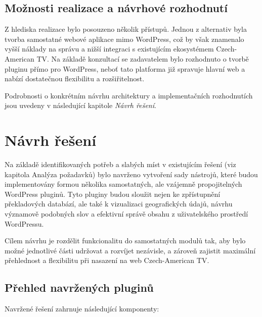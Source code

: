 \documentclass[czech, ba, kiv, he]{fasthesis}
\begin{document}
\subsection{Možnosti realizace a návrhové rozhodnutí}

Z hlediska realizace bylo posouzeno několik přístupů. Jednou z alternativ byla tvorba samostatné webové aplikace mimo WordPress, což by však znamenalo vyšší náklady na správu a nižší integraci s existujícím ekosystémem Czech-American TV. Na základě konzultací se zadavatelem bylo rozhodnuto o tvorbě pluginu přímo pro WordPress, neboť tato platforma již spravuje hlavní web a nabízí dostatečnou flexibilitu a rozšiřitelnost.

Podrobnosti o konkrétním návrhu architektury a implementačních rozhodnutích jsou uvedeny v následující kapitole \textit{Návrh řešení}.

\section{Návrh řešení}


Na základě identifikovaných potřeb a slabých míst v existujícím řešení (viz kapitola Analýza požadavků) bylo navrženo vytvoření sady nástrojů, které budou implementovány formou několika samostatných, ale vzájemně propojitelných WordPress pluginů. Tyto pluginy budou sloužit nejen ke zpřístupnění překladových databází, ale také k vizualizaci geografických údajů, návrhu významově podobných slov a efektivní správě obsahu z uživatelského prostředí WordPressu.

Cílem návrhu je rozdělit funkcionalitu do samostatných modulů tak, aby bylo možné jednotlivé části udržovat a rozvíjet nezávisle, a zároveň zajistit maximální přehlednost a flexibilitu při nasazení na web Czech-American TV.

\subsection*{Přehled navržených pluginů}

Navržené řešení zahrnuje následující komponenty:
\end{document}

